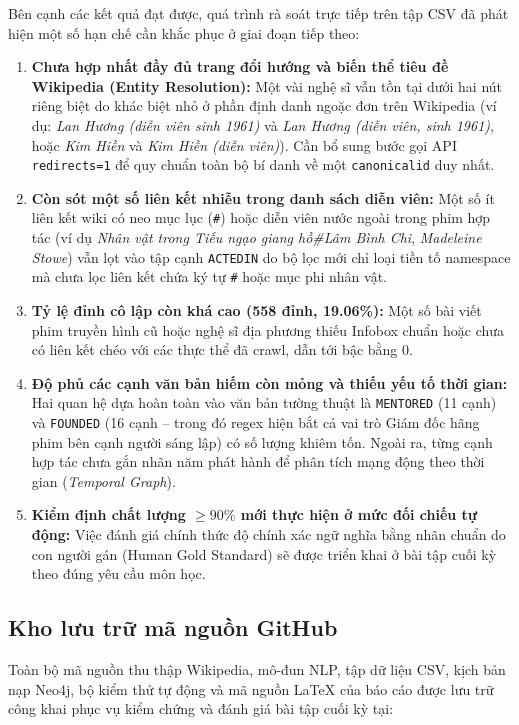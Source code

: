 \documentclass[12pt,a4paper]{article}
\renewcommand{\_}{\oldunderscore\hspace{0pt}}
\begin{document}
Bên cạnh các kết quả đạt được, quá trình rà soát trực tiếp trên tập CSV đã phát hiện một số hạn chế cần khắc phục ở giai đoạn tiếp theo:
\begin{enumerate}
  \item \textbf{Chưa hợp nhất đầy đủ trang đổi hướng và biến thể tiêu đề Wikipedia (Entity Resolution):} Một vài nghệ sĩ vẫn tồn tại dưới hai nút riêng biệt do khác biệt nhỏ ở phần định danh ngoặc đơn trên Wikipedia (ví dụ: \textit{Lan Hương (diễn viên sinh 1961)} và \textit{Lan Hương (diễn viên, sinh 1961)}, hoặc \textit{Kim Hiền} và \textit{Kim Hiền (diễn viên)}). Cần bổ sung bước gọi API \texttt{redirects=1} để quy chuẩn toàn bộ bí danh về một \texttt{canonical\_id} duy nhất.
  \item \textbf{Còn sót một số liên kết nhiễu trong danh sách diễn viên:} Một số ít liên kết wiki có neo mục lục (\texttt{\#}) hoặc diễn viên nước ngoài trong phim hợp tác (ví dụ \textit{Nhân vật trong Tiếu ngạo giang hồ\#Lâm Bình Chi}, \textit{Madeleine Stowe}) vẫn lọt vào tập cạnh \texttt{ACTED\_IN} do bộ lọc mới chỉ loại tiền tố namespace mà chưa lọc liên kết chứa ký tự \texttt{\#} hoặc mục phi nhân vật.
  \item \textbf{Tỷ lệ đỉnh cô lập còn khá cao (558 đỉnh, 19.06\%):} Một số bài viết phim truyền hình cũ hoặc nghệ sĩ địa phương thiếu Infobox chuẩn hoặc chưa có liên kết chéo với các thực thể đã crawl, dẫn tới bậc bằng 0.
  \item \textbf{Độ phủ các cạnh văn bản hiếm còn mỏng và thiếu yếu tố thời gian:} Hai quan hệ dựa hoàn toàn vào văn bản tường thuật là \texttt{MENTORED} (11 cạnh) và \texttt{FOUNDED} (16 cạnh -- trong đó regex hiện bắt cả vai trò Giám đốc hãng phim bên cạnh người sáng lập) có số lượng khiêm tốn. Ngoài ra, từng cạnh hợp tác chưa gắn nhãn năm phát hành để phân tích mạng động theo thời gian (\textit{Temporal Graph}).
  \item \textbf{Kiểm định chất lượng $\ge 90\%$ mới thực hiện ở mức đối chiếu tự động:} Việc đánh giá chính thức độ chính xác ngữ nghĩa bằng nhãn chuẩn do con người gán (Human Gold Standard) sẽ được triển khai ở bài tập cuối kỳ theo đúng yêu cầu môn học.
\end{enumerate}

\newpage
\subsection{Kho lưu trữ mã nguồn GitHub}

Toàn bộ mã nguồn thu thập Wikipedia, mô-đun NLP, tập dữ liệu CSV, kịch bản nạp Neo4j, bộ kiểm thử tự động và mã nguồn LaTeX của báo cáo được lưu trữ công khai phục vụ kiểm chứng và đánh giá bài tập cuối kỳ tại:
\end{document}
